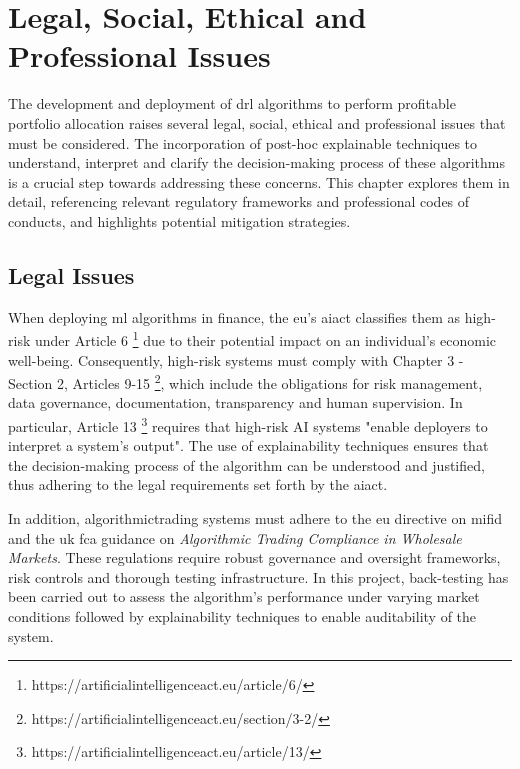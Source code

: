 \chapter{Legal, Social, Ethical and Professional Issues} \label{ch:issues}

The development and deployment of \acrfull{drl} algorithms to perform profitable portfolio allocation raises several legal, social, ethical and professional issues that must be considered. The incorporation of post-hoc explainable techniques to understand, interpret and clarify the decision-making process of these algorithms is a crucial step towards addressing these concerns. This chapter explores them in detail, referencing relevant regulatory frameworks and professional codes of conducts, and highlights potential mitigation strategies.

\section{Legal Issues} \label{sec:legal-issues}

When deploying \acrfull{ml} algorithms in finance, the \acrfull{eu}'s \acrfull{aiact} \cite{AIAct2024} classifies them as high-risk under Article 6 \footnote{https://artificialintelligenceact.eu/article/6/} due to their potential impact on an individual's economic well-being. Consequently, high-risk systems must comply with Chapter 3 - Section 2, Articles 9-15 \footnote{https://artificialintelligenceact.eu/section/3-2/}, which include the obligations for risk management, data governance, documentation, transparency and human supervision. In particular, Article 13 \footnote{https://artificialintelligenceact.eu/article/13/} requires that high-risk AI systems "enable deployers to interpret a system's output". The use of explainability techniques ensures that the decision-making process of the algorithm can be understood and justified, thus adhering to the legal requirements set forth by the \acrshort{aiact}.

In addition, \gls{algorithmictrading} systems must adhere to the \acrlong{eu} directive on \acrfull{mifid} \cite{MiFIDII} and the \acrfull{uk} \acrfull{fca} guidance on \textit{Algorithmic Trading Compliance in Wholesale Markets}. These regulations require robust governance and oversight frameworks, risk controls and thorough testing infrastructure. In this project, back-testing has been carried out to assess the algorithm's performance under varying market conditions followed by explainability techniques to enable auditability of the system.

